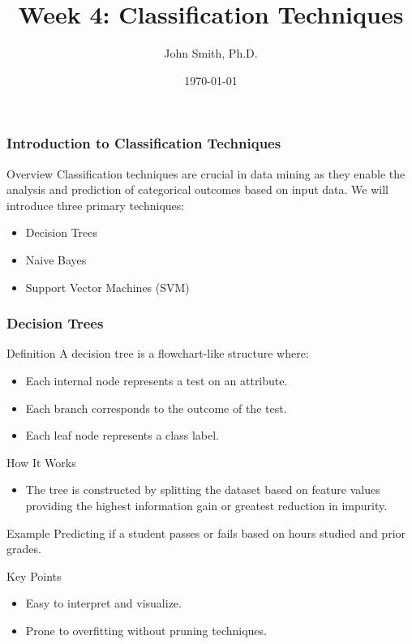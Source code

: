 \documentclass[aspectratio=169]{beamer}
\title[Classification Techniques]{Week 4: Classification Techniques}
\author[J. Smith]{John Smith, Ph.D.}
\institute[University Name]{
  Department of Computer Science\\
  University Name\\
  \vspace{0.3cm}
  Email: email@university.edu\\
  Website: www.university.edu
}
\date{\today}
\begin{document}
\frame{\titlepage}

\begin{frame}[fragile]
    \frametitle{Introduction to Classification Techniques}
    \begin{block}{Overview}
        Classification techniques are crucial in data mining as they enable the analysis and prediction of categorical outcomes based on input data. 
        We will introduce three primary techniques:
        \begin{itemize}
            \item Decision Trees
            \item Naive Bayes
            \item Support Vector Machines (SVM)
        \end{itemize}
    \end{block}
\end{frame}

\begin{frame}[fragile]
    \frametitle{Decision Trees}
    \begin{block}{Definition}
        A decision tree is a flowchart-like structure where:
        \begin{itemize}
            \item Each internal node represents a test on an attribute.
            \item Each branch corresponds to the outcome of the test.
            \item Each leaf node represents a class label.
        \end{itemize}
    \end{block}

    \begin{block}{How It Works}
        \begin{itemize}
            \item The tree is constructed by splitting the dataset based on feature values providing the highest information gain or greatest reduction in impurity.
        \end{itemize}
    \end{block}

    \begin{block}{Example}
        Predicting if a student passes or fails based on hours studied and prior grades.
    \end{block}

    \begin{block}{Key Points}
        \begin{itemize}
            \item Easy to interpret and visualize.
            \item Prone to overfitting without pruning techniques.
        \end{itemize}
    \end{block}
\end{frame}
\end{document}
